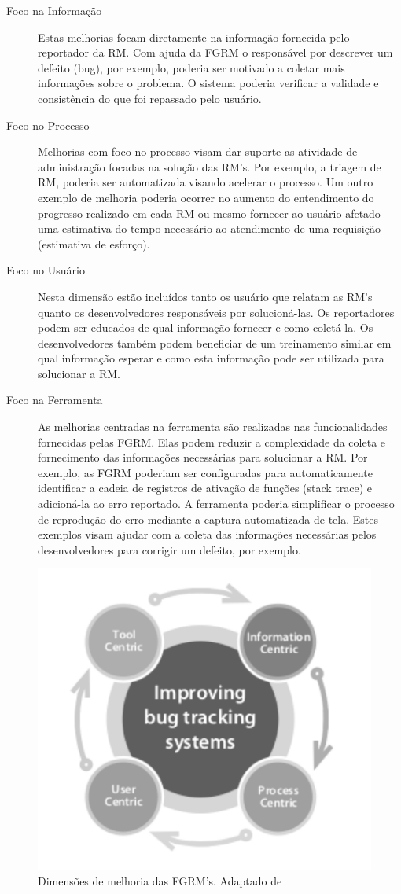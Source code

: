 \begin{description}
	\item[Foco na Informação] Estas melhorias focam diretamente na informação
		fornecida pelo reportador da RM\@. Com ajuda da FGRM o responsável por
		descrever um defeito (bug), por exemplo, poderia ser motivado a coletar mais
		informações sobre o problema. O sistema poderia verificar a validade e
		consistência do que foi repassado pelo usuário.
	\item[Foco no Processo] Melhorias com foco no processo visam dar suporte as
		atividade de administração focadas na solução das RM's. Por exemplo, a
		triagem de RM, poderia ser automatizada visando acelerar o processo. Um
		outro exemplo de melhoria poderia ocorrer no aumento do entendimento do
		progresso realizado em cada RM ou mesmo fornecer ao usuário afetado uma
		estimativa do tempo necessário ao atendimento de uma requisição
		(estimativa de esforço).
	\item[Foco no Usuário] Nesta dimensão estão incluídos tanto os usuário que
		relatam as RM's quanto os desenvolvedores responsáveis por
		solucioná-las.  Os reportadores podem ser educados de qual informação
		fornecer e como coletá-la. Os desenvolvedores também podem beneficiar de
		um treinamento similar em qual informação esperar e como esta informação
		pode ser utilizada para solucionar a RM\@.
	\item[Foco na Ferramenta] As melhorias centradas na ferramenta são
		realizadas nas funcionalidades fornecidas pelas FGRM\@. Elas podem
		reduzir a complexidade da coleta e fornecimento das informações
		necessárias para solucionar a RM\@. Por exemplo, as FGRM poderiam ser
		configuradas para automaticamente identificar a cadeia de registros de
		ativação de funções (stack trace) e adicioná-la ao erro reportado. A
		ferramenta poderia simplificar o processo de reprodução do erro mediante
		a captura automatizada de tela. Estes exemplos visam
		ajudar com a coleta das informações necessárias pelos desenvolvedores
		para corrigir um defeito, por exemplo.
\end{description}

\begin{figure}[htpb] \centering
	\includegraphics[width=0.5\linewidth]
	{chapter-intro/img/dimensoes_melhorias_fgrm.pdf}
	\caption{Dimensões de melhoria das FGRM's. Adaptado
		de~\cite{zimmermann2005mining}}\label{fig:dimensoes_melhorias_fgrm}
\end{figure}

